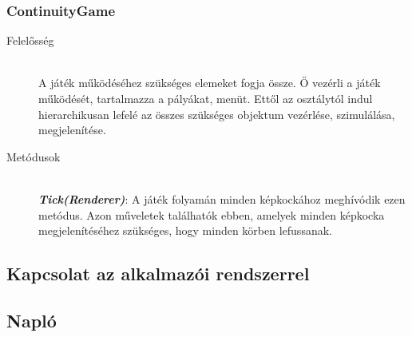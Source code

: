 \subsubsection{ContinuityGame}
	\begin{description}
		\item[Felelősség] \hfill \\
		A játék működéséhez szükséges elemeket fogja össze. Ő vezérli a játék működését, tartalmazza a pályákat,  menüt. Ettől az osztálytól indul hierarchikusan lefelé az összes szükséges objektum vezérlése, szimulálása, megjelenítése.
		\item[Metódusok]\hfill \\
		\textbf{\emph{Tick(Renderer)}}: A játék folyamán minden képkockához meghívódik ezen metódus. Azon műveletek találhatók ebben, amelyek minden képkocka megjelenítéséhez szükséges, hogy minden körben lefussanak.
	\end{description}


\subsection{Kapcsolat az alkalmazói rendszerrel}

\subsection{Napló}

\begin{journal}

\end{journal}

